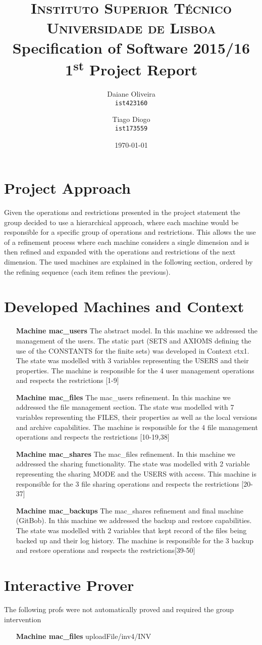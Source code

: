 \documentclass[paper=a4, fontsize=11pt]{scrartcl} %
\title{\vspace{-1.5cm}
\normalfont \normalsize 
\textsc{Instituto Superior Técnico\\Universidade de Lisboa} \\ [12pt] %
\huge Specification of Software 2015/16\\1\textsuperscript{st} Project Report \\ [5pt]
}
\author{
  Daiane Oliveira\\
  \texttt{ist423160}
  \and
  Tiago Diogo\\
  \texttt{ist173559}
}
\date{\normalsize\today} %
\numberwithin{equation}{section} %
\numberwithin{figure}{section} %
\numberwithin{table}{section} %
\begin{document}
\maketitle %

\section{Project Approach}
Given the operations and restrictions presented in the project statement the group decided to use a hierarchical approach, where each machine would be responsible for a specific group of operations and restrictions. This allows the use of a refinement process where each machine considers a single dimension and is then refined and expanded with the operations and restrictions of the next dimension. The used machines are explained in the following section, ordered by the refining sequence (each item refines the previous).

\section{Developed Machines and Context}
\begin{itemize}
	\item[\textbf{Machine mac\_users}]The abstract model. In this machine we addressed the management of the users. The static part (SETS and AXIOMS defining the use of the CONSTANTS for the finite sets) was developed in Context ctx1. The state was modelled with 3 variables representing the USERS and their properties. The machine is responsible for the 4 user management operations and respects the restrictions [1-9]
	\item[\textbf{Machine mac\_files}]The mac\_users refinement. In this machine we addressed the file management section. The state was modelled with 7 variables representing the FILES, their properties as well as the local versions and archive capabilities. The machine is responsible for the 4 file management operations and respects the restrictions [10-19,38]
	\item[\textbf{Machine mac\_shares}]The mac\_files refinement. In this machine we addressed the sharing functionality. The state was modelled with 2 variable representing the sharing MODE and the USERS with access. This machine is responsible for the 3 file sharing operations and respects the restrictions [20-37]
	\item[\textbf{Machine mac\_backups}]The mac\_shares refinement and final machine (GitBob). In this machine we addressed the backup and restore capabilities. The state was modelled with 2 variables that kept record of the files being backed up and their log history. The machine is responsible for the 3 backup and restore operations and respects the restrictions[39-50]
\end{itemize}

\section{Interactive Prover}
The following profs were not automatically proved and required the group intervention
\begin{itemize}
	\item[\textbf{Machine mac\_files}] uploadFile/inv4/INV
\end{itemize}
\end{document}

